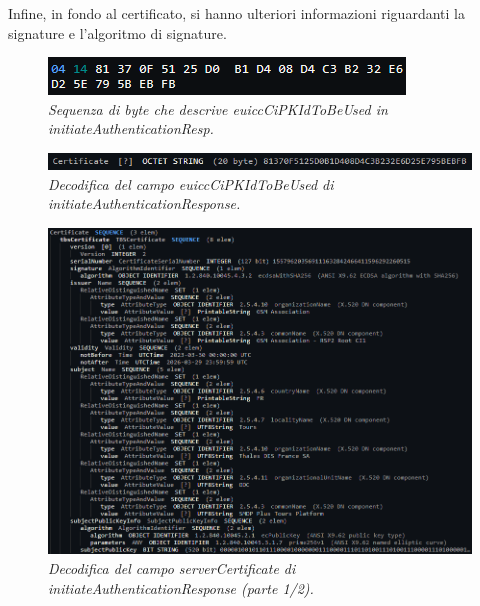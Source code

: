 \documentclass[10pt, oneside]{book}
\begin{document}
Infine, in fondo al certificato, si hanno ulteriori informazioni riguardanti la signature e l'algoritmo di signature.
\begin{figure}
\includegraphics[width=\linewidth]{asn1-euiccCiPKIdToBeUsed.png}
\caption{\textit{Sequenza di byte che descrive euiccCiPKIdToBeUsed in initiateAuthenticationResp.}}
\label{fig:asn1-euiccCiPKIdToBeUsed}
\end{figure}
\begin{figure}
\includegraphics[width=\linewidth]{decode-euiccCiPKIdToBeUsed.png}
\caption{\textit{Decodifica del campo euiccCiPKIdToBeUsed di initiateAuthenticationResponse.}}
\label{fig:decode-euiccCiPKIdToBeUsed}
\end{figure}
\begin{figure}
\includegraphics[width=\linewidth]{decode-serverCertificate1.png}
\caption{\textit{Decodifica del campo serverCertificate di initiateAuthenticationResponse (parte 1/2).}}
\label{fig:decode-serverCertificate1}
\end{figure}
\end{document}
